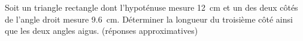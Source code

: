 
\begin{exercice}\label{exo2smath-0150}

    Soit un triangle rectangle dont l'hypoténuse mesure \SI{12}{\centi\meter} et un des deux côtés de l'angle droit mesure \SI{9.6}{\centi\meter}. Déterminer la longueur du troisième côté ainsi que les deux angles aigus. (réponses approximatives)

\end{exercice}
